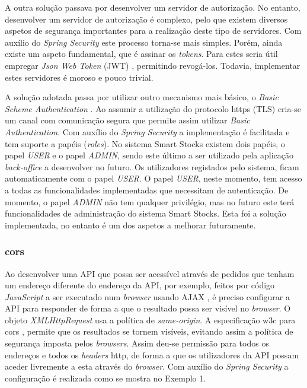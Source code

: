 A outra solução passava por desenvolver um servidor de autorização. No entanto, desenvolver um servidor de autorização é complexo, pelo que existem diversos aspetos de segurança importantes para a realização deste tipo de servidores. Com auxílio do \textit{Spring Security} este processo torna-se mais simples. Porém, ainda existe um aspeto fundamental, que é assinar os \textit{tokens}. Para estes seria útil empregar \textit{Json Web Token} (JWT) \cite{JSONWebT8:introduction}, permitindo revogá-los. Todavia, implementar estes servidores é moroso e pouco trivial. 

A solução adotada passa por utilizar outro mecanismo mais básico, o \textit{Basic Scheme Authentication} \cite{RFC7617:basicSheme}. Ao assumir a utilização do protocolo \acrfull{https} \cite{RFC2660:https} (TLS) \cite{RFC5246T88:tls} cria-se um canal com comunicação segura que permite assim utilizar \textit{Basic Authentication}. Com auxílio do \textit{Spring Security} a implementação é facilitada e tem suporte a papéis (\textit{roles}). No sistema Smart Stocks existem dois papéis, o papel \textit{USER} e o papel \textit{ADMIN}, sendo este último a ser utilizado pela aplicação \textit{back-office} a desenvolver no futuro. Os utilizadores registados pelo sistema, ficam automaticamente com o papel \textit{USER}. O papel \textit{USER}, neste momento, tem acesso a todas as funcionalidades implementadas que necessitam de autenticação.
De momento, o papel \textit{ADMIN} não tem qualquer privilégio, mas no futuro este terá funcionalidades de administração do sistema Smart Stocks. Esta foi a solução implementada, no entanto é um dos aspetos a melhorar futuramente.

\subsubsection{\acrlong{cors}}

Ao desenvolver uma API que possa ser acessível através de pedidos que tenham um endereço diferente do endereço da API, por exemplo, feitos por código \textit{JavaScript} a ser executado num \textit{browser} usando AJAX \cite{Ajax:mozilla}, é preciso configurar a API para responder de forma a que o resultado possa ser visível no \textit{browser}. O objeto \textit{XMLHttpRequest} \cite{XMLHttp:online} usa a política de \textit{same-origin}. A especificação \acrfull{w3c} para \acrfull{cors} \cite{CrossOrigin:resource}, permite que os resultados se tornem visíveis, evitando assim a política de segurança imposta pelos \textit{browsers}. Assim deu-se permissão para todos os endereços e todos os \textit{headers} \acrshort{http}, de forma a que os utilizadores da API possam aceder livremente a esta através do \textit{browser}. Com auxílio do \textit{Spring Security} a configuração é realizada como se mostra no Exemplo 1.

